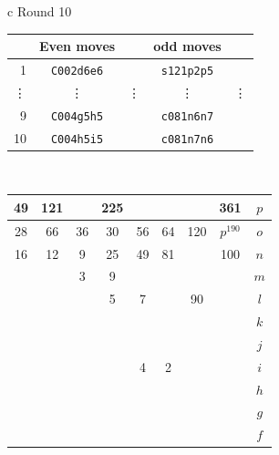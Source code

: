 \documentclass[12pt]{article}
\begin{document}
{\small{
\begin{tabular}{c}
Round 10 \\
\begin{tabular}{r|cc|cc}
 & Even moves &    & odd moves &  \\    \hline 
1   &  {\tt C002d6e6} & \quad &  {\tt s121p2p5} & \quad \\
\vdots &  \vdots    & \vdots  & \vdots    & \vdots \\  
9   &  {\tt C004g5h5} & \quad &  {\tt c081n6n7} & \quad \\
10  &  {\tt C004h5i5} & \quad &  {\tt c081n7n6} & \quad \\
\end{tabular}
\\
\begin{tabular}{|c|c|c|c|c|c|c|c||c} \hline
\squadfill{\,}49 & \squadfill{\,}121 & \quad & \squadfill{\,}225 & \quad & \quad & \quad & \squadfill{\,}361 & $p$ \\ \hline
\squadfill{\,}28 & \squadfill{\,}66 & \trianglepafill{\,}36 & \trianglepafill{\,}30 & \trianglepafill{\,}56 & \trianglepafill{\,}64 & \squadfill{\,}120 & \rhombusfill{\,}$p^{190}$ & $o$ \\ \hline
\trianglepafill{\,}16 & \trianglepafill{\,}12 & \circletfill{\,}9 & \circletfill{\,}25 & \circletfill{\,}49 & \circletfill{\,}81 & \quad & \trianglepafill{\,}100 & $n$ \\ \hline
\quad & \quad & \circletfill{\,}3 & \circletfill{\,}9 & \quad & \quad & \quad & \quad & $m$ \\ \hline
\quad & \quad & \quad & \circletfill{\,}5 & \circletfill{\,}7 & \quad & \trianglepafill{\,}90 & \quad & $l$ \\ \hline
\quad & \quad & \quad & \quad & \quad & \quad & \quad & \quad & $k$ \\ \hline
\quad & \quad & \quad & \quad & \quad & \quad & \quad & \quad & $j$ \\ \hline
\quad & \quad & \quad & \quad & \circlet{\,}4 & \circlet{\,}2 & \quad & \quad & $i$ \\ \hline
\quad & \quad & \quad & \quad & \quad & \quad & \quad & \quad & $h$ \\ \hline
\quad & \quad & \quad & \quad & \quad & \quad & \quad & \quad & $g$ \\ \hline
\quad & \quad & \quad & \quad & \quad & \quad & \quad & \quad & $f$ \\ \hline

\end{tabular}
\end{tabular}}}
\end{document}
